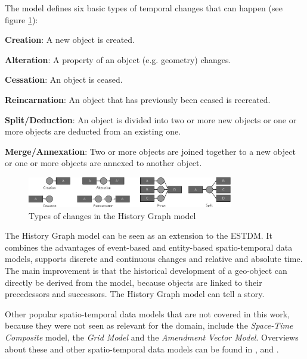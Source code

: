 The model defines six basic types of temporal changes that can happen (see figure \ref{fig:history_graph_changes}):
\begin{compactitem}
  \item \textbf{Creation}:           A new object is created.
  \item \textbf{Alteration}:         A property of an object (e.g. geometry) changes.
  \item \textbf{Cessation}:          An object is ceased.
  \item \textbf{Reincarnation}:      An object that has previously been ceased is recreated.
  \item \textbf{Split/Deduction}:    An object is divided into two or more new objects or one or more objects are deducted from an existing one.
  \item \textbf{Merge/Annexation}:   Two or more objects are joined together to a new object or one or more objects are annexed to another object.
\end{compactitem}

\begin{figure}[ht]
  \centering
  \includegraphics[width=0.8\textwidth]{graphics/basics/stdm/history_graph_changes}
  \caption{Types of changes in the History Graph model}
  \label{fig:history_graph_changes}
\end{figure}

The History Graph model can be seen as an extension to the ESTDM. It combines the advantages of event-based and entity-based spatio-temporal data models, supports discrete and continuous changes and relative and absolute time. The main improvement is that the historical development of a geo-object can directly be derived from the model, because objects are linked to their precedessors and successors. The History Graph model can tell a story.


\vspace{1em}
Other popular spatio-temporal data models that are not covered in this work, because they were not seen as relevant for the domain, include the \emph{Space-Time Composite} model, the \emph{Grid Model} and the \emph{Amendment Vector Model}. Overviews about these and other spatio-temporal data models can be found in \cite{zhao11}, \cite{pelekis04stdms} and \cite{peuquet99}.


